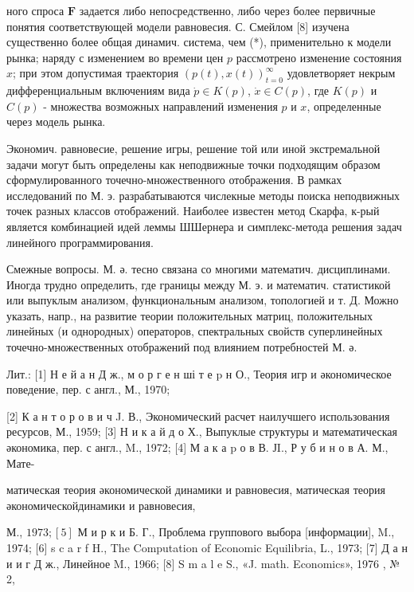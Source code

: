 \documentclass[10pt]{article}
\begin{document}
ного спроса $\boldsymbol{F}$ задается либо непосредственно, либо через более первичные понятия соответствующей модели равновесия. С. Смейлом [8] изучена существенно более общая динамич. система, чем (*), применительно к модели рынка; наряду с изменением во времени цен $p$ рассмотрено изменение состояния $x$; при этом допустимая траектория $(p(t), x(t))_{t=0}^{\infty}$ удовлетворяет некрым дифференциальным включениям вида $\dot{p} \in K(p)$, $\dot{x} \in C(p)$, где $K(p)$ и $C(p)$ - множества возможных направлений изменения $p$ и $x$, определенные через модель рынка.



Экономич. равновесие, решение игры, решение той или иной экстремальной задачи могут быть определены как неподвижные точки подходящим образом сформулированного точечно-множественного отображения. В рамках исследований по М. э. разрабатываются числекные методы поиска неподвижных точек разных классов отображений. Наиболее известен метод Скарфа, к-рый является комбинацией идей леммы ШШернера и симплекс-метода решения задач линейного программирования.



Смежные вопросы. М. ә. тесно связана со многими математич. дисциплинами. Иногда трудно определить, где границы между М. э. и математич. статистикой или выпуклым анализом, функциональным анализом, топологией и т. Д. Можно указать, напр., на развитие теории положительных матриц, положительных линейных (и однородных) операторов, спектральных свойств суперлинейных точечно-множественных отображений под влиянием потребностей М. ә.



Лит.: [1] Н е й а н Д ж., м о р г е н ші т е p н О., Теория игр и әкономическое поведение, пер. с англ., М., 1970;

[2] К а н т о р о в и ч J. В., Экономический расчет наилучшего использования ресурсов, М., 1959; [3] Н и к а й д о Х., Выпуклые структуры и математическая әкономика, пер. с англ., M., 1972; [4] М а к а p о в В. ЈI., Р у б и н о в А. М., Мате-

матическая теория әкономической динамики и равновесия, матическая теория әкономическойдинамики и равновесия,

М., $1973 ;[5]$ М и р к и Б. Г., Проблема группового выбора [информации], M., 1974; [6] s c a r f H., The Computation of Economic Equilibria, L., 1973; [7] Д а н и и г Д ж., Линейное M., 1966; [8] S m a l e S., «J. math. Economics», 1976 , № 2,
\end{document}
